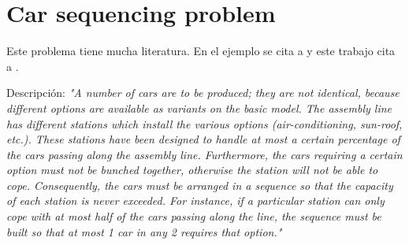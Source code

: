 

\onecolumn


\section{Car sequencing problem}

Este problema tiene mucha literatura.
En el ejemplo se cita a \cite{regin1997filtering} y este trabajo cita a
\cite{dincbas1988solving}.

Descripción: \textit{ "A number of cars are to be produced; they are not identical, 
because different options are available as variants on the basic model. 
 The assembly line has different stations which install the various options (air-conditioning, sun-roof, etc.). 
 These stations have been designed to handle at most a certain percentage of 
 the cars passing along the assembly line. 
 Furthermore, the cars requiring a certain option must not be bunched together, 
 otherwise the station will not be able to cope. Consequently, the cars must be 
 arranged in a sequence so that the capacity of each station is never exceeded. 
 For instance, if a particular station can only cope with at most half of the 
 cars passing along the line, the sequence must be built so that at most 1 car in any 2 requires that option."}


